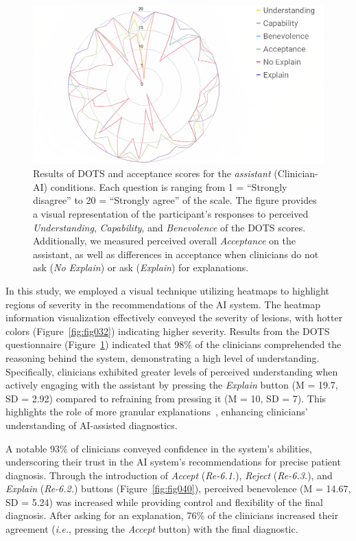 \begin{figure}[htbp]
\centering
\includegraphics[width=\columnwidth]{images/fig111}
\caption{Results of DOTS and acceptance scores for the {\it assistant} (Clinician-AI) conditions. Each question is ranging from 1 = ``Strongly disagree'' to 20 = ``Strongly agree'' of the scale. The figure provides a visual representation of the participant's responses to perceived {\it Understanding}, {\it Capability}, and {\it Benevolence} of the DOTS scores. Additionally, we measured perceived overall {\it Acceptance} on the assistant, as well as differences in acceptance when clinicians do not ask ({\it No Explain}) or ask ({\it Explain}) for explanations.}
\label{fig:fig111}
\end{figure}

In this study, we employed a visual technique utilizing heatmaps to highlight regions of severity in the recommendations of the \ac{AI} system.
The heatmap information visualization effectively conveyed the severity of lesions, with hotter colors (Figure~\ref{fig:fig032}) indicating higher severity.
Results from the \ac{DOTS} questionnaire (Figure~\ref{fig:fig111}) indicated that 98\% of the clinicians comprehended the reasoning behind the system, demonstrating a high level of understanding.
Specifically, clinicians exhibited greater levels of perceived understanding when actively engaging with the assistant by pressing the {\it Explain} button (M = 19.7, SD = 2.92) compared to refraining from pressing it (M = 10, SD = 7).
This highlights the role of more granular explanations~\cite{10.1145/3544548.3580945}, enhancing clinicians' understanding of \ac{AI}-assisted diagnostics.

A notable 93\% of clinicians conveyed confidence in the system's abilities, underscoring their trust in the \ac{AI} system's recommendations for precise patient diagnosis.
Through the introduction of {\it Accept} ({\it Re-6.1.}), {\it Reject} ({\it Re-6.3.}), and {\it Explain} ({\it Re-6.2.}) buttons (Figure~\ref{fig:fig040}), perceived benevolence (M = 14.67, SD = 5.24) was increased while providing control and flexibility of the final diagnosis.
After asking for an explanation, 76\% of the clinicians increased their agreement ({\it i.e.}, pressing the {\it Accept} button) with the final diagnostic.

